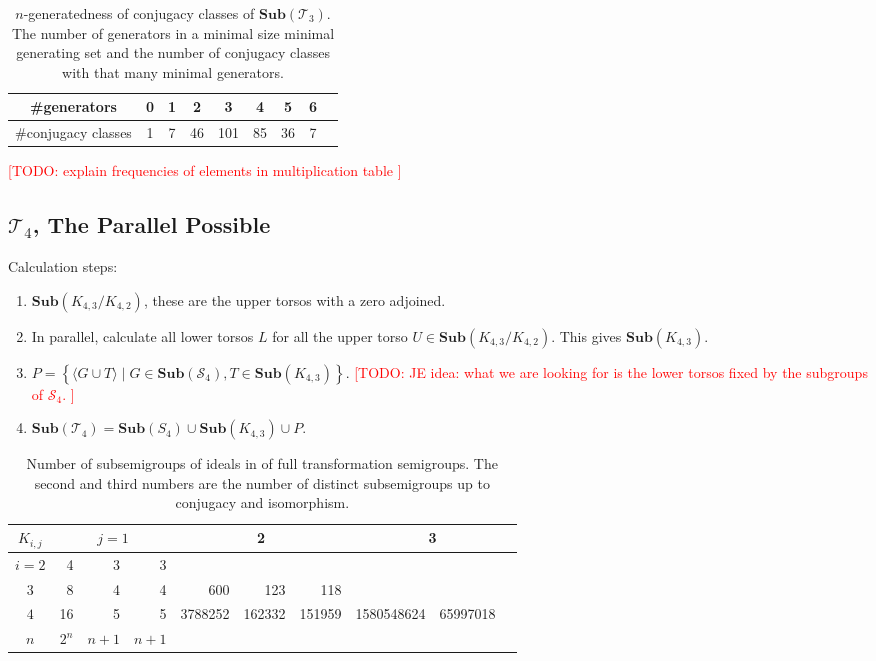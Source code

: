 \documentclass{amsart}
\newcommand{\cT}{{\mathcal T}}
\newcommand{\cS}{{\mathcal S}}
\newcommand{\Sub}{\mathbf{Sub}}
\newcommand{\todo}[1]{\textcolor{red}{ \small \textsf{[TODO:  #1 ]} \normalsize}}
\theoremstyle{plain}
\theoremstyle{definition}
\begin{document}
\begin{table}
\small
\renewcommand{\tabcolsep}{1pt}
\renewcommand{\arraystretch}{1}
\begin{tabular}{|c|c|c|c|c|c|c|c|c|}
\hline
\#generators&0&1&2&3& 4 & 5 & 6 \\
\hline
\#conjugacy classes &1&  7& 46& 101& 85& 36& 7 \\
\hline
\end{tabular}
\normalsize
\caption{$n$-generatedness of conjugacy classes of $\Sub(\cT_3)$. The number of generators in a minimal size minimal generating set and the number of conjugacy classes with that many minimal generators.}
\label{tab:T3ngeneratedness}
\end{table}


\todo{explain frequencies of elements in multiplication table}

\subsection{$\cT_4$, The Parallel Possible }

Calculation steps:

\begin{enumerate}
\item $\Sub(K_{4,3}/K_{4,2})$, these are the upper torsos with a zero adjoined.
\item In parallel, calculate all lower torsos $L$ for all the upper torso $U\in \Sub(K_{4,3}/K_{4,2})$. This gives $\Sub(K_{4,3})$.
\item $P=\left\{\langle G\cup T\rangle\mid G\in\Sub(\cS_4), T\in\Sub(K_{4,3})\right\}$. \todo{JE idea: what we are looking for is the lower torsos fixed by the subgroups of $\cS_4$.}
\item $\Sub(\cT_4)=\Sub(S_4)\cup\Sub(K_{4,3})\cup P$.
\end{enumerate}

\begin{table}
\renewcommand{\tabcolsep}{2pt}
\renewcommand{\arraystretch}{1}
\begin{tabular}{|c|r|r|r||r|r|r||r|r|r|}
\hline
$K_{i,j}$ & \multicolumn{3}{c||}{$j=1$} & \multicolumn{3}{c||}{2} & \multicolumn{3}{c|}{3} \\
\hline
$i=2$ & 4&3&3   & \cellcolor{gray9}  & \cellcolor{gray9}&  \cellcolor{gray9} & \cellcolor{gray9}  &\cellcolor{gray9} &\cellcolor{gray9}\\
\hline
$3$ &  8&4&4  &  600 & 123 & 118  & \cellcolor{gray9}  & \cellcolor{gray9}&\cellcolor{gray9}\\
\hline
$4$ & 16&5&5  &  3788252 & 162332 & 151959  & 1580548624  & 65997018&\\
\hline
$n$ & $2^n$&$n+1$&$n+1$    &    & &    &    & & \\
\hline

\end{tabular}
\caption{Number of subsemigroups of ideals in of full transformation semigroups. The second and third numbers are the number of distinct subsemigroups up to conjugacy and isomorphism.}
\end{table}
\end{document}
